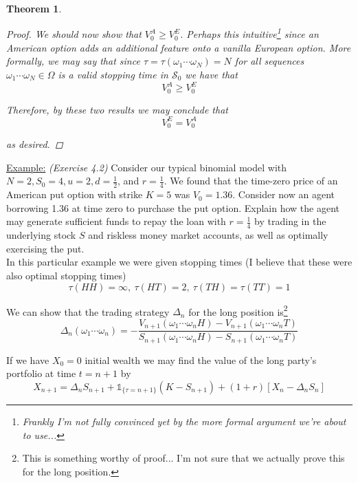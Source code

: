 \documentclass[12pt]{article}
\newtheorem{theorem}{Theorem}
\newlength\tindent
\renewcommand{\indent}{\hspace*{\tindent}}
\begin{document}
\begin{theorem}
\begin{proof}
We should now show that $V^A_0 \geq V^E_0$. Perhaps this intuitive\footnote{Frankly I'm not fully convinced yet by the more formal argument we're about to use...} since an American option adds an additional feature onto a vanilla European option. More formally, we may say that since $\tau = \tau(\omega_1\cdots\omega_N) = N$ for all sequences $\omega_1\cdots\omega_N \in \Omega$ is a valid stopping time in $\mathcal S_0$ we have that
\begin{equation*}
	V^A_0 \geq V^E_0
\end{equation*}

Therefore, by these two results we may conclude that
\begin{equation*}
	V^E_0 = V^A_0
\end{equation*}

as desired.
\end{proof}
\end{theorem}

\underline{Example:} {\em (Exercise 4.2)} Consider our typical binomial model with $N = 2, S_0 = 4, u = 2, d = \frac{1}{2}$, and $r = \frac{1}{4}$. We found that the time-zero price of an American put option with strike $K = 5$ was $V_0 = 1.36$. Consider now an agent borrowing 1.36 at time zero to purchase the put option. Explain how the agent may generate sufficient funds to repay the loan with $r = \frac{1}{4}$ by trading in the underlying stock $S$ and riskless money market accounts, as well as optimally exercising the put. \\

\indent In this particular example we were given stopping times (I believe that these were also optimal stopping times)
\begin{equation*}
	\tau(HH) = \infty,~\tau(HT) = 2,~\tau(TH) = \tau(TT) = 1
\end{equation*}

We can show that the trading strategy $\Delta_n$ for the long position is\footnote{This is something worthy of proof... I'm not sure that we actually prove this for the long position.}
\begin{equation*}
	\Delta_n(\omega_1\cdots\omega_n) = - \frac{ V_{n + 1}(\omega_1\cdots\omega_n H) - V_{n + 1}(\omega_1\cdots\omega_n T) }{ S_{n + 1}(\omega_1\cdots\omega_n H) - S_{n + 1}(\omega_1\cdots\omega_n T) }
\end{equation*}

\indent If we have $X_0 = 0$ initial wealth we may find the value of the long party's portfolio at time $t = n + 1$ by
\begin{equation*}
	X_{n + 1} = \Delta_n S_{n + 1} + \mathds 1_{\{ \tau = n + 1\}}(K - S_{n + 1}) + (1 + r)[X_n - \Delta_nS_n]
\end{equation*}
\end{document}
